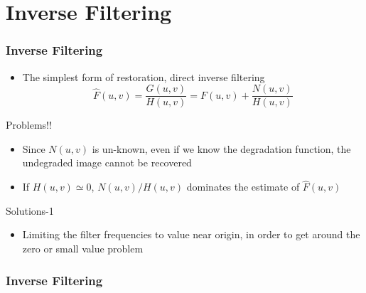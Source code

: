 \documentclass{beamer}
\begin{document}
\section{Inverse Filtering}
\begin{frame}
\frametitle{Inverse Filtering}
\begin{itemize}
\item The simplest form of restoration, direct inverse filtering  
$$\hat{F}(u,v) = \frac{G(u,v)}{H(u,v)} = F(u,v) + \frac{N(u,v)}{H(u,v)}$$
\end{itemize}

\begin{block}{Problems!!}
\scriptsize{
\begin{itemize}
\item Since $N(u,v)$ is un-known, even if we know the degradation function, the undegraded image cannot be recovered
\item  If $H(u,v)\simeq 0$, $N(u,v)/H(u,v)$  dominates the estimate of $\hat{F}(u,v)$
\end{itemize}
}
\end{block}
\begin{block}{Solutions-1}
\scriptsize{
\begin{itemize}
\item  Limiting the filter frequencies to value near origin, in order to get around the zero or small value problem 
\end{itemize}
}
\end{block}
\end{frame}
\begin{frame}
\frametitle{Inverse Filtering}
\\
\end{frame}
\end{document}

